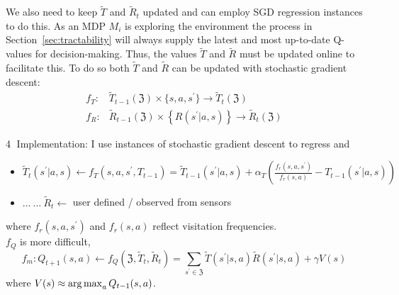 We also need to keep $\tilde{T}$ and $\tilde{R}_t$ updated and can employ SGD regression instances to do this. As an MDP $M_i$ is exploring the environment the process in Section~\ref{sec:tractability} will always supply the latest and most up-to-date Q-values for decision-making. Thus, the values $\tilde{T}$ and $\tilde{R}$ must be updated online to facilitate this. To do so both $\tilde{T}$ and $\tilde{R}$ can be updated with stochastic gradient descent:
\begin{align*}
f_T: & \tilde{T}_{t-1}(\mathfrak{Z})\times\{s,a,s^\prime\}\rightarrow \tilde{T}_t(\mathfrak{Z}) \\
f_R: & \tilde{R}_{t-1}( \mathfrak{Z} ) \times \left\{  R( s^\prime | a, s ) \right\} \rightarrow \tilde{R}_t( \mathfrak{Z} )
\end{align*}
 

 
\textcircled{4} Implementation: I use instances of stochastic gradient descent to regress  and 

\begin{itemize}
\item $\tilde{T}_t(s^\prime | a, s ) \leftarrow f_T(s,a,s^\prime,T_{t-1}) = \tilde{T}_{t-1}(s^\prime|a,s)+\alpha_T\left(\frac{f_r(s,a,s^\prime)}{f_r(s,a)}-T_{t-1}(s^\prime|a,s)\right)$
\item
$\ldots\:\ldots\:\tilde{R}_t \leftarrow$ user defined / observed from sensors
\end{itemize}
where $f_r(s,a,s^\prime)$ and $f_r(s,a)$ reflect visitation frequencies.\\

$f_Q$ is more difficult, 
\begin{equation*}
f_m: Q_{t+1}(s,a) \leftarrow f_Q \left( \mathfrak{Z}, \tilde{T}_t, \tilde{R}_t \right) = \sum_{s^\prime \in \mathfrak{Z}} \tilde{T}(s^\prime|s,a) \tilde{R}(s^\prime|s,a) +\gamma V(s)
\end{equation*}
where $V(s)\approx \operatorname*{arg\,max}_{a} Q_{t-1}(s,a)$. 
